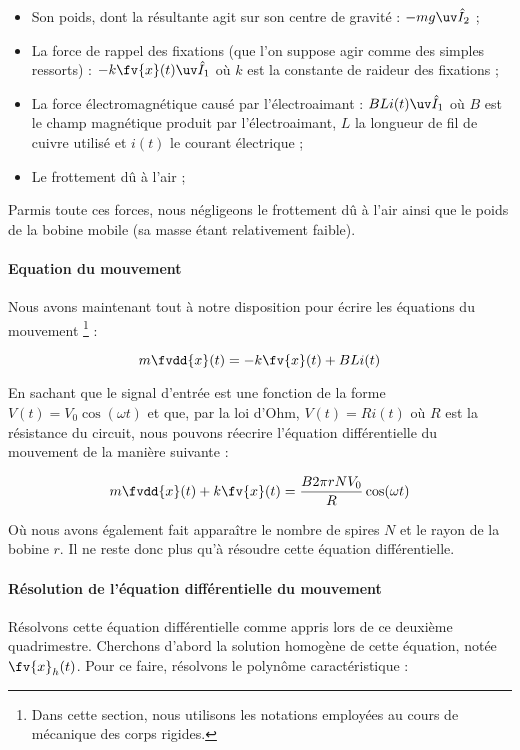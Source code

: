 \begin{itemize}
	\item Son poids, dont la résultante agit sur son centre de gravité : $-mg\uv \hat{{I}}_2$ ;
	\item La force de rappel des fixations (que l'on suppose agir comme des simples
	ressorts) : $-k \fv{x}(t) \uv\hat{{I}}_1$ où $k$ est la constante de raideur des fixations ;
	\item La force électromagnétique causé par l'électroaimant : $BLi(t) \uv \hat{{I}}_1$ où
	$B$ est le champ magnétique produit par l'électroaimant, $L$ la longueur de fil de cuivre
	utilisé et $i(t)$ le courant électrique ;
	\item Le frottement dû à l'air ;
\end{itemize}

Parmis toute ces forces, nous négligeons le frottement dû à l'air ainsi que le poids
de la bobine mobile (sa masse étant relativement faible).

\paragraph{Equation du mouvement}
Nous avons maintenant tout à notre disposition pour écrire les équations du mouvement
\footnote{Dans cette section, nous utilisons les notations employées au cours de
mécanique des corps rigides.} :

$$m\fvdd{x}(t) = -k\fv{x}(t) + BLi(t)$$

En sachant que le signal d'entrée est une fonction de la forme $V(t) = V_0 \cos (\omega t)$ et
que, par la loi d'Ohm, $V(t) = Ri(t)$ où $R$ est la résistance du circuit, 
nous pouvons réecrire l'équation différentielle du mouvement de la manière suivante :

$$m\fvdd{x}(t) + k\fv{x}(t) = \frac{B2\pi rNV_0}{R}\cos (\omega t)$$

Où nous avons également fait apparaître le nombre de spires $N$ et le rayon de la bobine
$r$. Il ne reste donc plus qu'à résoudre cette équation différentielle.

\paragraph{Résolution de l'équation différentielle du mouvement}
Résolvons cette équation différentielle comme appris lors de ce deuxième
quadrimestre. Cherchons d'abord la solution homogène de cette équation, notée $\fv{x}_h(t)$.
Pour ce faire, résolvons le polynôme caractéristique :

